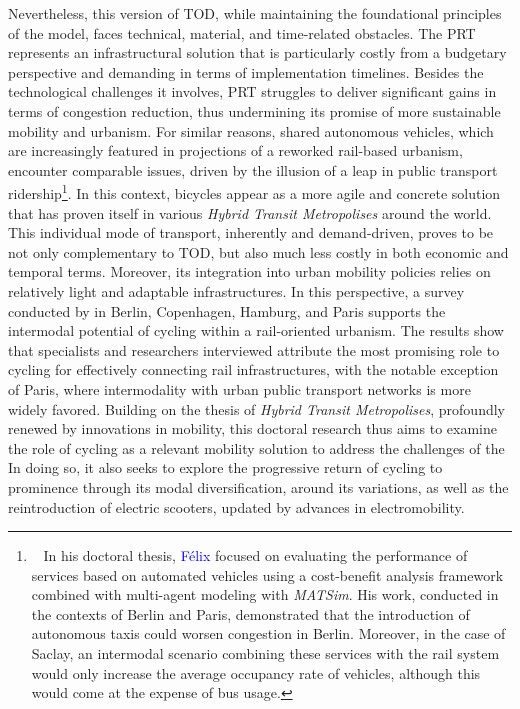 \begin{refsegment}
Nevertheless, this version of \acrshort{TOD}, while maintaining the foundational principles of the model, faces technical, material, and time-related obstacles. The \acrshort{PRT} represents an infrastructural solution that is particularly costly from a budgetary perspective and demanding in terms of implementation timelines. Besides the technological challenges it involves, \acrshort{PRT} struggles to deliver significant gains in terms of congestion reduction, thus undermining its promise of more sustainable mobility and urbanism. For similar reasons, shared autonomous vehicles, which are increasingly featured in projections of a reworked rail-based urbanism, encounter comparable issues, driven by the illusion of a leap in public transport ridership\footnote{~
    In his doctoral thesis, \textcolor{blue}{Félix} \textcolor{blue}{\textcite[333]{carreyre_are_2023}} focused on evaluating the performance of services based on automated vehicles using a cost-benefit analysis framework combined with multi-agent modeling with \textsl{MATSim}. His work, conducted in the contexts of Berlin and Paris, demonstrated that the introduction of autonomous taxis could worsen congestion in Berlin. Moreover, in the case of Saclay, an intermodal scenario combining these services with the rail system would only increase the average occupancy rate of vehicles, although this would come at the expense of bus usage.
}. In this context, bicycles appear as a more agile and concrete solution that has proven itself in various \textsl{Hybrid Transit Metropolises} around the world. This individual mode of transport, inherently  and demand-driven, proves to be not only complementary to \acrshort{TOD}, but also much less costly in both economic and temporal terms. Moreover, its integration into urban mobility policies relies on relatively light and adaptable infrastructures. In this perspective, a survey conducted by \textcolor{blue}{\textcite[119]{goletz_intermodality_2020}} in Berlin, Copenhagen, Hamburg, and Paris supports the intermodal potential of cycling within a rail-oriented urbanism. The results show that specialists and researchers interviewed attribute the most promising role to cycling for effectively connecting rail infrastructures, with the notable exception of Paris, where intermodality with urban public transport networks is more widely favored. Building on the thesis of \textsl{Hybrid Transit Metropolises}, profoundly renewed by innovations in mobility, this doctoral research thus aims to examine the role of cycling as a relevant mobility solution to address the challenges of the  In doing so, it also seeks to explore the progressive return of cycling to prominence through its modal diversification, around its variations, as well as the reintroduction of electric scooters, updated by advances in electromobility.%


\end{refsegment}
